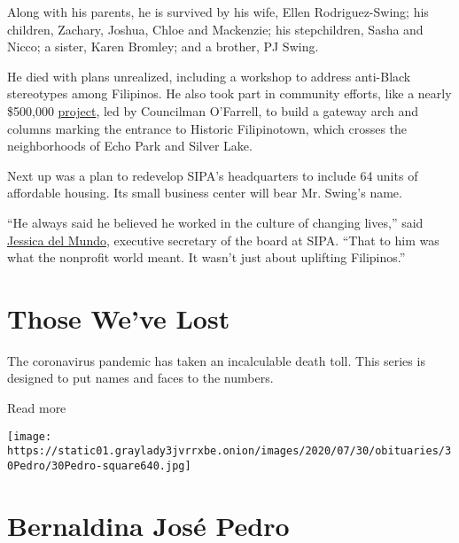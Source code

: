 Along with his parents, he is survived by his wife, Ellen
Rodriguez-Swing; his children, Zachary, Joshua, Chloe and Mackenzie; his
stepchildren, Sasha and Nicco; a sister, Karen Bromley; and a brother,
PJ Swing.

He died with plans unrealized, including a workshop to address
anti-Black stereotypes among Filipinos. He also took part in community
efforts, like a nearly \$500,000
\href{https://www.theeastsiderla.com/neighborhoods/historic_filipinotown/plans-unveiled-for-452-000-gateway-to-historic-filipinotown/article_096736f6-ad28-11ea-8a45-d34c6d8d6822.html\#:~:text=\%22Historic\%20Filipinotown\%20will\%20have\%20a,\%2C\%22\%20O'Farrell\%20said.\&text=Designed\%20by\%20Filipino\%20artist\%20Eliseo,Gabay\%3A\%20Our\%20Guiding\%20Star.\%E2\%80\%9D}{project},
led by Councilman O'Farrell, to build a gateway arch and columns marking
the entrance to Historic Filipinotown, which crosses the neighborhoods
of Echo Park and Silver Lake.

Next up was a plan to redevelop SIPA's headquarters to include 64 units
of affordable housing. Its small business center will bear Mr. Swing's
name.

``He always said he believed he worked in the culture of changing
lives,'' said \href{https://sipacares.org/about/board/}{Jessica del
Mundo}, executive secretary of the board at SIPA. ``That to him was what
the nonprofit world meant. It wasn't just about uplifting Filipinos.''

\href{https://www.nytimes3xbfgragh.onion/interactive/2020/obituaries/people-died-coronavirus-obituaries.html?action=click\&pgtype=Article\&state=default\&region=BELOW_MAIN_CONTENT\&context=covid_obits_promo}{}

\hypertarget{those-weve-lost}{%
\section{Those We've Lost}\label{those-weve-lost}}

The coronavirus pandemic has taken an incalculable death toll. This
series is designed to put names and faces to the numbers.

Read more

\texttt{[image: https://static01.graylady3jvrrxbe.onion/images/2020/07/30/obituaries/30Pedro/30Pedro-square640.jpg]}

\hypertarget{bernaldina-josuxe9-pedro}{%
\section{Bernaldina José Pedro}\label{bernaldina-josuxe9-pedro}}

